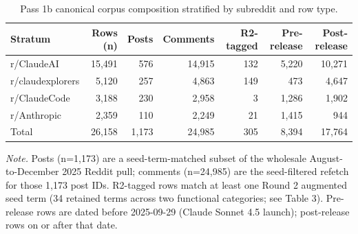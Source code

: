 \begin{table}[!htbp]
\centering
\caption{Pass 1b canonical corpus composition stratified by subreddit and row type.}
\label{tab:corpus_composition}
\small
\begin{tabular}{lrrrrrr}
\toprule
\textbf{Stratum} & \textbf{Rows (n)} & \textbf{Posts} & \textbf{Comments} & \textbf{R2-tagged} & \textbf{Pre-release} & \textbf{Post-release} \\
\midrule
r/ClaudeAI & 15,491 & 576 & 14,915 & 132 & 5,220 & 10,271 \\
r/claudexplorers & 5,120 & 257 & 4,863 & 149 & 473 & 4,647 \\
r/ClaudeCode & 3,188 & 230 & 2,958 & 3 & 1,286 & 1,902 \\
r/Anthropic & 2,359 & 110 & 2,249 & 21 & 1,415 & 944 \\
Total & 26,158 & 1,173 & 24,985 & 305 & 8,394 & 17,764 \\
\bottomrule
\end{tabular}

\vspace{0.5em}
\raggedright
\textit{Note.} Posts (n=1{,}173) are a seed-term-matched subset of the wholesale August-to-December 2025 Reddit pull; comments (n=24{,}985) are the seed-filtered refetch for those 1{,}173 post IDs. R2-tagged rows match at least one Round 2 augmented seed term (34 retained terms across two functional categories; see Table 3). Pre-release rows are dated before 2025-09-29 (Claude Sonnet 4.5 launch); post-release rows on or after that date.
\end{table}
